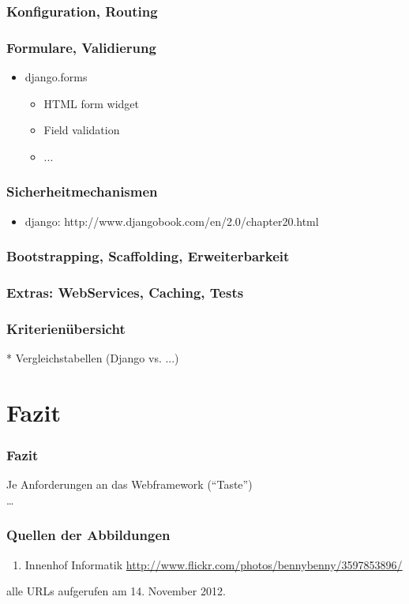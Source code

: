 \documentclass[
    t,
    smaller,
    compress,
]{beamer}
\begin{document}
\begin{frame}
  \frametitle{Konfiguration, Routing}
\end{frame}


\begin{frame}
  \frametitle{Formulare, Validierung}
  
  \begin{itemize}[<1->]
    \item django.forms
	 \begin{itemize}[<1->]
		\item HTML form widget
		\item Field validation
		\item ...
	\end{itemize}
  \end{itemize}

\end{frame}


\begin{frame}
  \frametitle{Sicherheitmechanismen}
  
  \begin{itemize}[<1->]
    \item django: http://www.djangobook.com/en/2.0/chapter20.html
    \end{itemize}

\end{frame}


\begin{frame}
  \frametitle{Bootstrapping, Scaffolding, Erweiterbarkeit}
\end{frame}


\begin{frame}
  \frametitle{Extras: WebServices, Caching, Tests}
\end{frame}


\begin{frame}
  \frametitle{Kriterienübersicht}
 * Vergleichstabellen (Django vs. ...)
\end{frame}


\section{Fazit}
\begin{frame}
  \frametitle{Fazit}

  Je Anforderungen an das Webframework (“Taste”)\\
  \dots
\end{frame}


\begin{frame}
  \frametitle{Quellen der Abbildungen}
  \footnotesize
  \begin{enumerate}[<1->]
    \item Innenhof Informatik
        \url{http://www.flickr.com/photos/bennybenny/3597853896/} \label{illu:1}
  \end{enumerate}
  alle URLs aufgerufen am 14. November 2012.
\end{frame}
\end{document}
